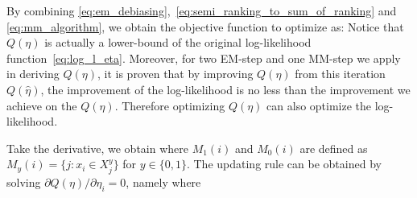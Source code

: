 By combining \eqref{eq:em_debiasing},~\eqref{eq:semi_ranking_to_sum_of_ranking} and \eqref{eq:mm_algorithm},
we obtain the objective function to optimize as:
%
Notice that $Q(\eta)$ is actually a lower-bound of the original log-likelihood function~\eqref{eq:log_l_eta}.
Moreover, for two EM-step and one MM-step we apply in deriving $Q(\eta)$,
it is proven that by improving $Q(\eta)$ from this iteration $Q(\hat{\eta})$, 
the improvement of the log-likelihood is no less than the improvement we achieve on the $Q(\eta)$.  
Therefore optimizing $Q(\eta)$ can also optimize the log-likelihood.



Take the derivative, we obtain
%
where $M_1(i)$ and $M_0(i)$ are defined as $M_y(i) = \{j:x_i \in X_j^y\}$ for $y \in \{0, 1\}$.
The updating rule can be obtained by solving $\partial Q(\eta) / \partial \eta_i = 0$, namely
where

